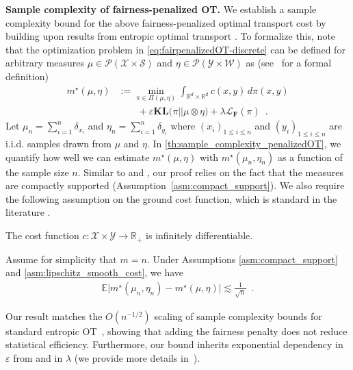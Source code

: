 \documentclass{article}
\newcommand{\kl}{\mathbf{KL}}
\theoremstyle{definition}
\begin{document}
\textbf{Sample complexity of fairness-penalized OT.}
We establish a sample complexity bound for the above fairness-penalized optimal transport cost by building upon results from entropic optimal transport \citep{genevay2019sample,mena2019statistical}. To formalize this, note that the optimization problem in \eqref{eq:fairpenalizedOT-discrete} can be defined for arbitrary measures $\mu \in \mathcal{P}(\mathcal{X} \times \mathcal{S})$ and $\eta \in \mathcal{P}(\mathcal{Y} \times \mathcal{W})$ as (see~ for a formal definition)
\begin{align*}
    m^\star(\mu,\eta)&:=\min_{\pi \in \Pi(\mu, \eta)} \textstyle\int_{\mathbb{R}^d \times \mathbb{R}^d} c(x,y)\,d\pi(x,y) \\
    &\qquad+ \varepsilon\kl\big(\pi|| \mu\otimes \eta\big)+ \lambda \mathcal{L}_\mathbf{F}(\pi)\enspace.
\end{align*}
Let $\mu_n = \sum_{i=1}^n \delta_{x_i}$ and $\eta_n  = \sum_{i=1}^n \delta_{y_i}$ where $(x_i)_{1\leq i\leq n}$ and $(y_i)_{1\leq i\leq n}$ are i.i.d. samples drawn from $\mu$ and $\eta$. In \cref{th:sample_complexity_penalizedOT}, we quantify how well we can estimate $m^\star(\mu,\eta)$ with $m^\star(\mu_n,\eta_n)$ as a function of the sample size $n$.
Similar to \cite{rigollet2022sample} and \cite{genevay2019sample}, our proof relies on the fact that the  measures are compactly supported (Assumption~\ref{asm:compact_support}). We also require the following assumption on the ground cost function, which is standard in the literature \citep{genevay2019sample}.
\begin{boxasm}
    \label{asm:lipschitz_smooth_cost}
    The cost function $c:\mathcal{X} \times \mathcal{Y} \to \mathbb{R}_+$ is infinitely differentiable. 
\end{boxasm} 
\begin{boxthm}\label{th:sample_complexity_penalizedOT}
     Assume for simplicity that $m=n$. Under Assumptions \ref{asm:compact_support} and \ref{asm:lipschitz_smooth_cost}, we have
    \begin{align*}
        \mathbb{E}\big\lvert m^\star(\mu_n,\eta_n)-m^\star(\mu,\eta)\big\lvert \lesssim \frac{1}{\sqrt{n}}\enspace.
    \end{align*}
\end{boxthm}
Our result matches the $O(n^{-1/2})$ scaling of sample complexity bounds for standard entropic OT~\citep{genevay2019sample,mena2019statistical}, showing that adding the fairness penalty does not reduce statistical efficiency. Furthermore, our bound inherits exponential dependency in $\varepsilon$ from \citet{genevay2019entropy} and in $\lambda$ (we provide more details in~). 
\end{document}
